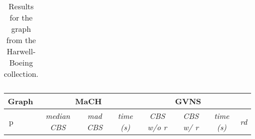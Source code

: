 \documentclass{scrartcl}
\theoremstyle{plain}
\newcommand{\algo}{MaCH}
\newcommand{\gvns}{GVNS}
\newcommand{\cbs}{CBS}
\begin{document}
\begin{table}[!ht]
\begin{tabular}{|lll|rrr|rrr|r|}
\hline

\end{tabular}

	\caption{\label{tab:harwell_perf}Results for the graph from the 
Harwell-Boeing collection.}
\end{table}





\begin{table}[!ht]
	\centering
	\scriptsize
	\begin{tabular}{|lll|rrr|rrr|r|}
	\hline
\multicolumn{3}{|c}{\textbf{Graph}} &  \multicolumn{3}{|c|}{\textbf{\algo{}}} & 
\multicolumn{3}{c|}{\textbf{\gvns{}}} & \\ \hline

\multicolumn{1}{|c}{p} & \multicolumn{1}{c}{} & 
\multicolumn{1}{c|}{} &

\multicolumn{1}{|c}{\emph{median \cbs{}}} & \multicolumn{1}{c}{\emph{mad 
\cbs{}}} & \multicolumn{1}{c|}{ \emph{time (s)}} &

\multicolumn{1}{|c}{\emph{\cbs{} w/o r}} & \multicolumn{1}{c}{\emph{\cbs{} w/ 
r}} & \multicolumn{1}{c|}{ \emph{time (s)}} & 
\multicolumn{1}{c|}{\emph{rd}} \\ 
\hline


\end{tabular}
\end{table}
\end{document}
